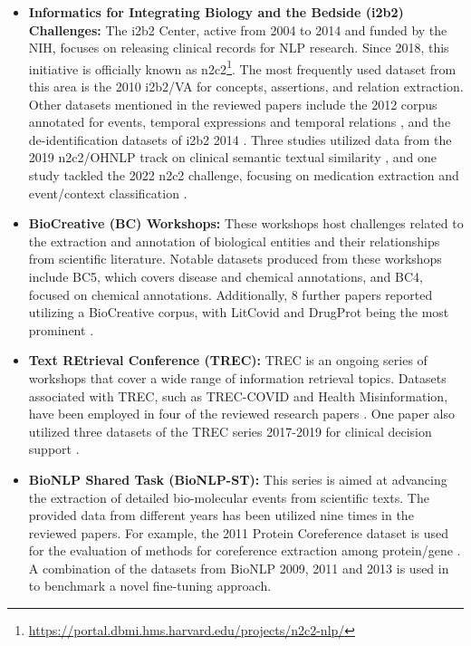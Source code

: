 \documentclass[fleqn,10pt]{olplainarticle}
\begin{document}
\begin{itemize}
    \item \textbf{Informatics for Integrating Biology and the Bedside (i2b2) Challenges:}  The i2b2 Center, active from 2004 to 2014 and funded by the NIH, focuses on releasing clinical records for NLP research. Since 2018, this initiative is officially known as n2c2\footnote{\url{https://portal.dbmi.hms.harvard.edu/projects/n2c2-nlp/}}. The most frequently used dataset from this area is the 2010 i2b2/VA for concepts, assertions, and relation extraction. Other datasets mentioned in the reviewed papers include the 2012 corpus annotated for events, temporal expressions and temporal relations \citep{chen2019general}, and the de-identification datasets of i2b2 2014 \citep{tang2019identification}. Three studies utilized data from the 2019 n2c2/OHNLP track on clinical semantic textual similarity \citep{mahajan2020identification,wang2021knowledge,xiong2023eara}, and one study tackled the 2022 n2c2 challenge, focusing on medication extraction and event/context classification \citep{chen2023contextualized}.

    \item \textbf{BioCreative (BC) Workshops:} These workshops host challenges related to the extraction and annotation of biological entities and their relationships from scientific literature. Notable datasets produced from these workshops include BC5, which covers disease and chemical annotations, and BC4, focused on chemical annotations. Additionally, 8 further papers reported utilizing a BioCreative corpus, with LitCovid and DrugProt being the most prominent \citep{lin2022bert,rabby2023multi,asada2023integrating,aldahdooh2023mining}.

    \item \textbf{Text REtrieval Conference (TREC):} TREC is an ongoing series of workshops that cover a wide range of information retrieval topics. Datasets associated with TREC, such as TREC-COVID and Health Misinformation, have been employed in four of the reviewed research papers \citep{sarrouti2021evidence,almeida2020frugal,tahri2023transitioning,otegi2020automatic}. One paper also utilized three datasets of the TREC series 2017-2019  for clinical decision support \citep{zhang2023hybrid}.

    \item \textbf{BioNLP Shared Task (BioNLP-ST):} This series is aimed at advancing the extraction of detailed bio-molecular events from scientific texts. The provided data from different years has been utilized nine times in the reviewed papers. For example, the 2011 Protein Coreference dataset is used for the evaluation of methods for coreference extraction among protein/gene \citep{li2022distinguished}.
    A combination of the datasets from BioNLP 2009, 2011 and 2013 is used in \cite{zeng2020tri} to benchmark a novel fine-tuning approach. 

\end{itemize}
\end{document}

